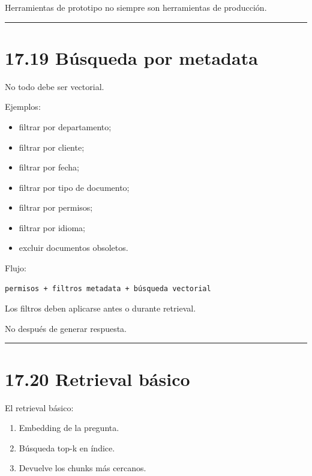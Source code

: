 Herramientas de prototipo no siempre son herramientas de producción.

\begin{center}\rule{0.5\linewidth}{0.5pt}\end{center}

\section{17.19 Búsqueda por metadata}\label{buxfasqueda-por-metadata}

No todo debe ser vectorial.

Ejemplos:

\begin{itemize}
\tightlist
\item
  filtrar por departamento;
\item
  filtrar por cliente;
\item
  filtrar por fecha;
\item
  filtrar por tipo de documento;
\item
  filtrar por permisos;
\item
  filtrar por idioma;
\item
  excluir documentos obsoletos.
\end{itemize}

Flujo:

\begin{lstlisting}
permisos + filtros metadata + búsqueda vectorial
\end{lstlisting}

Los filtros deben aplicarse antes o durante retrieval.

No después de generar respuesta.

\begin{center}\rule{0.5\linewidth}{0.5pt}\end{center}

\section{17.20 Retrieval básico}\label{retrieval-buxe1sico}

El retrieval básico:

\begin{enumerate}
\def\labelenumi{\arabic{enumi}.}
\tightlist
\item
  Embedding de la pregunta.
\item
  Búsqueda top-k en índice.
\item
  Devuelve los chunks más cercanos.
\end{enumerate}

